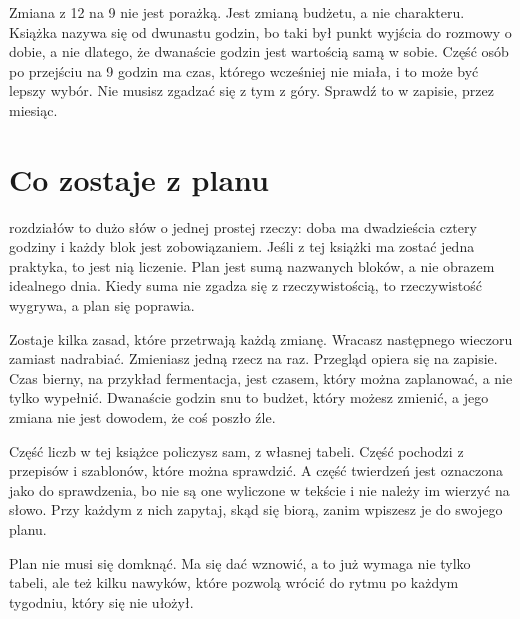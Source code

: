 Zmiana z 12 na 9 nie jest porażką. Jest zmianą budżetu, a nie charakteru. Książka nazywa się od dwunastu godzin, bo taki był punkt wyjścia do rozmowy o dobie, a nie dlatego, że dwanaście godzin jest wartością samą w sobie. Część osób po przejściu na 9 godzin ma czas, którego wcześniej nie miała, i to może być lepszy wybór. Nie musisz zgadzać się z tym z góry. Sprawdź to w zapisie, przez miesiąc.

\section{Co zostaje z planu}

 rozdziałów to dużo słów o jednej prostej rzeczy: doba ma dwadzieścia cztery godziny i każdy blok jest zobowiązaniem. Jeśli z tej książki ma zostać jedna praktyka, to jest nią liczenie. Plan jest sumą nazwanych bloków, a nie obrazem idealnego dnia. Kiedy suma nie zgadza się z rzeczywistością, to rzeczywistość wygrywa, a plan się poprawia.

Zostaje kilka zasad, które przetrwają każdą zmianę. Wracasz następnego wieczoru zamiast nadrabiać. Zmieniasz jedną rzecz na raz. Przegląd opiera się na zapisie. Czas bierny, na przykład fermentacja, jest czasem, który można zaplanować, a nie tylko wypełnić. Dwanaście godzin snu to budżet, który możesz zmienić, a jego zmiana nie jest dowodem, że coś poszło źle.

Część liczb w tej książce policzysz sam, z własnej tabeli. Część pochodzi z przepisów i szablonów, które można sprawdzić. A część twierdzeń jest oznaczona jako do sprawdzenia, bo nie są one wyliczone w tekście i nie należy im wierzyć na słowo. Przy każdym z nich zapytaj, skąd się biorą, zanim wpiszesz je do swojego planu.

Plan nie musi się domknąć. Ma się dać wznowić, a to już wymaga nie tylko tabeli, ale też kilku nawyków, które pozwolą wrócić do rytmu po każdym tygodniu, który się nie ułożył.

